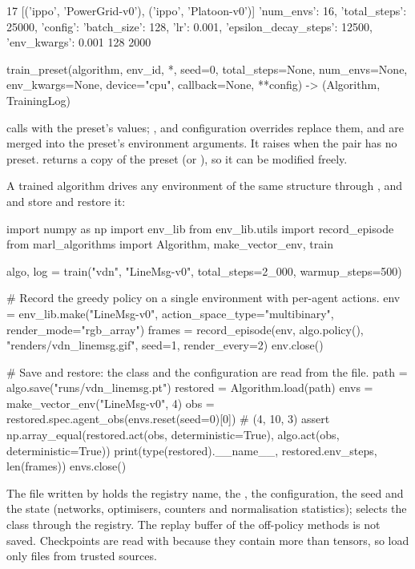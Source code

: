 \begin{textcode}
17 [('ippo', 'PowerGrid-v0'), ('ippo', 'Platoon-v0')]
{'num_envs': 16, 'total_steps': 25000, 'config': {'batch_size': 128,
'lr': 0.001, 'epsilon_decay_steps': 12500}, 'env_kwargs': {}}
0.001 128 2000
\end{textcode}

\begin{pycode}
train_preset(algorithm, env_id, *, seed=0, total_steps=None, num_envs=None,
             env_kwargs=None, device="cpu", callback=None,
             **config) -> (Algorithm, TrainingLog)
\end{pycode}
calls  with the preset's values; ,
 and configuration overrides replace them, and
 are merged into the preset's environment arguments. It
raises  when the pair has no preset.
 returns a copy of the preset (or ), so it can be
modified freely.

A trained algorithm drives any environment of the same structure through
, and  and  store and restore
it:

\begin{pycode}
import numpy as np
import env_lib
from env_lib.utils import record_episode
from marl_algorithms import Algorithm, make_vector_env, train

algo, log = train("vdn", "LineMsg-v0", total_steps=2_000, warmup_steps=500)

# Record the greedy policy on a single environment with per-agent actions.
env = env_lib.make("LineMsg-v0", action_space_type="multibinary",
                   render_mode="rgb_array")
frames = record_episode(env, algo.policy(), "renders/vdn_linemsg.gif",
                        seed=1, render_every=2)
env.close()

# Save and restore: the class and the configuration are read from the file.
path = algo.save("runs/vdn_linemsg.pt")
restored = Algorithm.load(path)
envs = make_vector_env("LineMsg-v0", 4)
obs = restored.spec.agent_obs(envs.reset(seed=0)[0])     # (4, 10, 3)
assert np.array_equal(restored.act(obs, deterministic=True),
                      algo.act(obs, deterministic=True))
print(type(restored).__name__, restored.env_steps, len(frames))
envs.close()
\end{pycode}

The file written by  holds the registry name, the
, the configuration, the seed and the state (networks,
optimisers, counters and normalisation statistics); 
selects the class through the registry. The replay buffer of the off-policy
methods is not saved. Checkpoints are read with  because they contain more than tensors, so load only
files from trusted sources.

